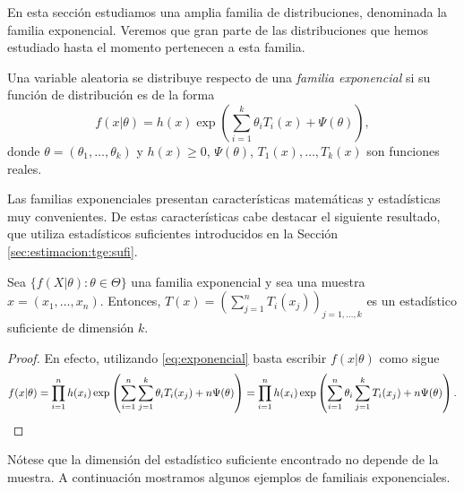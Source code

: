 \documentclass{article}
\begin{document}
    En esta sección estudiamos una amplia familia de distribuciones, denominada la familia exponencial. Veremos que gran parte de las distribuciones que hemos estudiado hasta el momento pertenecen a esta familia.

    \begin{definition}
        Una variable aleatoria se distribuye respecto de una \emph{familia exponencial} si su función de distribución es de la forma
        \begin{equation} \label{eq:exponencial}
            f(x | \theta) = h(x) \exp\left(\sum^k_{i=1} \theta_i T_i(x)  + \Psi (\theta)\right),
        \end{equation}
        donde $\theta = (\theta_1, \ldots, \theta_k)$ y $h(x) \ge 0$, $\Psi(\theta)$, $T_1(x), \ldots, T_k(x)$ son funciones reales.
    \end{definition}

    Las familias exponenciales presentan características matemáticas y estadísticas muy convenientes. De estas características cabe destacar el siguiente resultado, que utiliza estadísticos suficientes introducidos en la Sección \ref{sec:estimacion:tge:sufi}.

    \begin{prop} \label{prop:exp:sufi}
        Sea $\{f(X | \theta): \theta \in \Theta\}$ una familia exponencial y sea una muestra $x = (x_1, \ldots, x_n)$. Entonces, $T(x) = (\sum_{j = 1}^n T_i(x_j))_{j = 1, \ldots, k}$ es un estadístico suficiente de dimensión $k$.
    \end{prop}
    \begin{proof}
        En efecto, utilizando \eqref{eq:exponencial} basta escribir $f(x | \theta)$ como sigue
        \begin{equation*}
            f(x | \theta) = \prod_{i=1}^n h(x_i) \exp\left(\sum^n_{i=1}\sum^k_{j=1} \theta_i T_i(x_j)  + n\Psi(\theta)\right) = \prod_{i=1}^{n}h(x_i) \exp\left(\sum_{i=1}^{n}\theta_i \sum^k_{j=1} T_i(x_j)  + n\Psi(\theta)\right). \qedhere
        \end{equation*}
    \end{proof}

    Nótese que la dimensión del estadístico suficiente encontrado no depende de la muestra. A continuación mostramos algunos ejemplos de familiais exponenciales.
\end{document}
